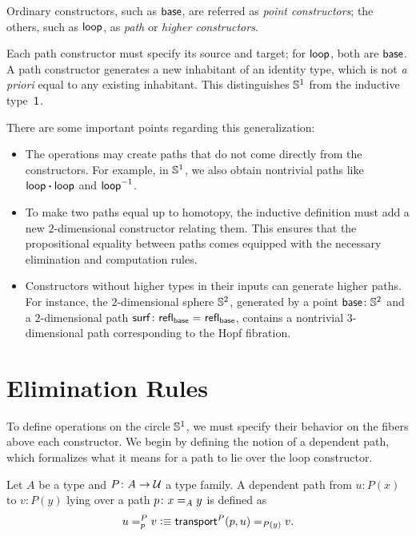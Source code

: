 Ordinary constructors, such as $\mathsf{base}$, are referred as \textsl{point constructors}; the others, such as $\mathsf{loop}$, as \textsl{path} or \textsl{higher constructors}.

Each path constructor must specify its source and target; for $\mathsf{loop}$, both are $\mathsf{base}$. A path constructor generates a new inhabitant of an identity type, which is not \textit{a priori\/} equal to any existing inhabitant. This distinguishes $\mathbb S^1$ from the inductive type~$\mathsf{1}$.

There are some important points regarding this generalization:
\begin{itemize}
    \item The operations may create paths that do not come directly from the constructors. For example, in $\mathbb S^1$, we also obtain nontrivial paths like $\mathsf{loop}\mathbin{\boldsymbol{\cdot}}\mathsf{loop}$ and $\mathsf{loop}^{-1}$.
    
    \item To make two paths equal up to homotopy, the inductive definition must add a new $2$-dimensional constructor relating them. This ensures that the propositional equality between paths comes equipped with the necessary elimination and computation rules.
        
    \item Constructors without higher types in their inputs can generate higher paths. For instance, the $2$-dimensional sphere $\mathbb S^2$, generated by a point $\fun{base}\colon\sphere^2$ and a $2$-dimensional path $\fun{surf}\colon\fun{refl}_{\fun{base}}\eq{}\fun{refl}_{\fun{base}}$, contains a nontrivial $3$-dimensional path corresponding to the Hopf fibration.
\end{itemize}

\section{Elimination Rules}

To define operations on the circle $\mathbb S^1$, we must specify their behavior on the fibers above each constructor. We begin by defining the notion of a dependent path, which formalizes what it means for a path to lie over the loop constructor.

\begin{defn}\label{defn:eqt}
    Let $A$ be a type and $P\colon A\to\univ$ a type family. A dependent path from $u\colon P(x)$ to $v\colon P(y)$ lying over a path $p\colon x\eq{A}y$ is defined as
    \[
        u=_{p}^{P}v\mathrel{\vcentcolon}\equiv\mathsf{transport}^P(p,u)\mathrel{=_{P(y)}}v.
    \]
\end{defn}

